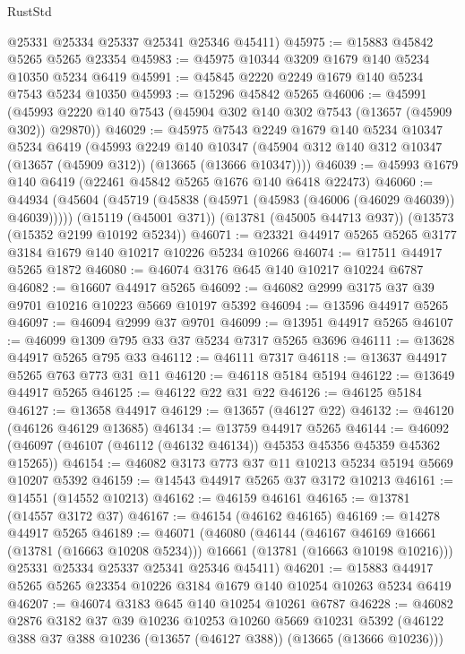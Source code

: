 \begin{lexlean}{RustStd}
\begin{coremodule}
      @25331
      @25334
      @25337
      @25341
      @25346
      @45411)
@45975 := @15883 @45842 @5265 @5265 @23354
@45983 := @45975 @10344 @3209 @1679 @140 @5234 @10350 @5234 @6419
@45991 := @45845 @2220 @2249 @1679 @140 @5234 @7543 @5234 @10350
@45993 := @15296 @45842 @5265
@46006 := @45991
    (@45993 @2220 @140 @7543 (@45904 @302 @140 @302 @7543 (@13657 (@45909 @302)) @29870))
@46029 := @45975
    @7543
    @2249
    @1679
    @140
    @5234
    @10347
    @5234
    @6419
    (@45993
      @2249
      @140
      @10347
      (@45904 @312 @140 @312 @10347 (@13657 (@45909 @312)) (@13665 (@13666 @10347))))
@46039 := @45993 @1679 @140 @6419 (@22461 @45842 @5265 @1676 @140 @6418 @22473)
@46060 := @44934
    (@45604 (@45719 (@45838 (@45971 (@45983 (@46006 (@46029 @46039)) @46039)))))
    (@15119 (@45001 @371))
    (@13781 (@45005 @44713 @937))
    (@13573 (@15352 @2199 @10192 @5234))
@46071 := @23321 @44917 @5265 @5265 @3177 @3184 @1679 @140 @10217 @10226 @5234 @10266
@46074 := @17511 @44917 @5265 @1872
@46080 := @46074 @3176 @645 @140 @10217 @10224 @6787
@46082 := @16607 @44917 @5265
@46092 := @46082 @2999 @3175 @37 @39 @9701 @10216 @10223 @5669 @10197 @5392
@46094 := @13596 @44917 @5265
@46097 := @46094 @2999 @37 @9701
@46099 := @13951 @44917 @5265
@46107 := @46099 @1309 @795 @33 @37 @5234 @7317 @5265 @3696
@46111 := @13628 @44917 @5265 @795 @33
@46112 := @46111 @7317
@46118 := @13637 @44917 @5265 @763 @773 @31 @11
@46120 := @46118 @5184 @5194
@46122 := @13649 @44917 @5265
@46125 := @46122 @22 @31 @22
@46126 := @46125 @5184
@46127 := @13658 @44917
@46129 := @13657 (@46127 @22)
@46132 := @46120 (@46126 @46129 @13685)
@46134 := @13759 @44917 @5265
@46144 := @46092 (@46097 (@46107 (@46112 (@46132 @46134)) @45353 @45356 @45359 @45362 @15265))
@46154 := @46082 @3173 @773 @37 @11 @10213 @5234 @5194 @5669 @10207 @5392
@46159 := @14543 @44917 @5265 @37 @3172 @10213
@46161 := @14551 (@14552 @10213)
@46162 := @46159 @46161
@46165 := @13781 (@14557 @3172 @37)
@46167 := @46154 (@46162 @46165)
@46169 := @14278 @44917 @5265
@46189 := @46071
    (@46080
      (@46144
        (@46167 @46169 @16661 (@13781 (@16663 @10208 @5234)))
        @16661
        (@13781 (@16663 @10198 @10216)))
      @25331
      @25334
      @25337
      @25341
      @25346
      @45411)
@46201 := @15883 @44917 @5265 @5265 @23354 @10226 @3184 @1679 @140 @10254 @10263 @5234 @6419
@46207 := @46074 @3183 @645 @140 @10254 @10261 @6787
@46228 := @46082
    @2876
    @3182
    @37
    @39
    @10236
    @10253
    @10260
    @5669
    @10231
    @5392
    (@46122 @388 @37 @388 @10236 (@13657 (@46127 @388)) (@13665 (@13666 @10236)))

\end{coremodule}
\end{lexlean}

